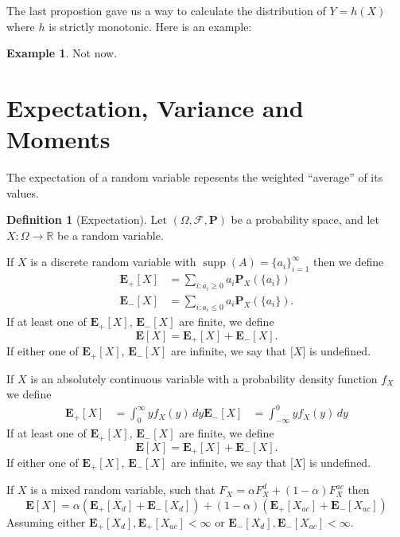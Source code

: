 \documentclass[11pt,a4paper]{article}
\theoremstyle{definition}
\newtheorem{definition}{Definition}[section]
\newtheorem{example}{Example}[section]
\theoremstyle{plain}
\DeclareMathOperator{\supp}{supp}
\newcommand{\R}{\mathbb{R}}
\begin{document}
  The last propostion gave us a way to calculate the distribution of
  $Y = h(X)$ where $h$ is strictly monotonic. Here is an example:
  \begin{example}
    Not now.
  \end{example}

  \newpage

  \section{Expectation, Variance and Moments}

  The expectation of a random variable repesents the weighted ``average'' of 
  its values.

  \begin{definition}[Expectation]
    Let $(\Omega, \mathcal F, \mathbf P)$ be a probability space,
    and let $X \colon \Omega \to \R$ be a random variable.

    If $X$ is a discrete random variable with 
    $\supp(A) = \{a_i\}_{i=1}^{\infty}$ then we define
    \begin{align*}
      \mathbf E_{+}[X] &=
      \sum_{i \colon a_i \geq 0} a_i \mathbf P_X\left(\{a_i\}\right) \\
      \mathbf E_{-}[X] &=
      \sum_{i \colon a_i \le 0} a_i \mathbf P_X\left(\{a_i\}\right).
    \end{align*}
    If at least one of $\mathbf E_{+}[X]$, $\mathbf E_{-}[X]$ are finite, 
    we define
    \[
      \mathbf E[X] = \mathbf E_{+}[X] + \mathbf E_{-}[X].
    \]
    If either one of $\mathbf E_{+}[X]$, $\mathbf E_{-}[X]$ are infinite,
    we say that $\mathbf [X]$ is undefined.

    If $X$ is an absolutely continuous variable with a probability density
    function $f_X$ we define
    \begin{align*}
      \mathbf E_{+}[X] &=
      \int_{0}^{\infty} y f_X(y)\,dy
      \mathbf E_{-}[X] &=
      \int_{-\infty}^{0} y f_X(y)\,dy
    \end{align*}
    If at least one of $\mathbf E_{+}[X]$, $\mathbf E_{-}[X]$ are finite, 
    we define
    \[
      \mathbf E[X] = \mathbf E_{+}[X] + \mathbf E_{-}[X].
    \]
    If either one of $\mathbf E_{+}[X]$, $\mathbf E_{-}[X]$ are infinite,
    we say that $\mathbf [X]$ is undefined.

    If $X$ is a mixed random variable, such that 
    $F_X = \alpha F_X^d + (1-\alpha)F_X^{ac}$ then
    \[
      \mathbf E[X] = 
      \alpha (\mathbf E_{+}[X_d] + \mathbf E_{-}[X_d]) +
      (1 - \alpha) (\mathbf E_{+}[X_{ac}] + \mathbf E_{-}[X_{ac}])
    \]
    Assuming either $\mathbf E_+[X_{d}], \mathbf E_+[X_{ac}] < \infty$ or
    $\mathbf E_-[X_{d}], \mathbf E_-[X_{ac}] < \infty$.
  \end{definition}
  
\end{document}
